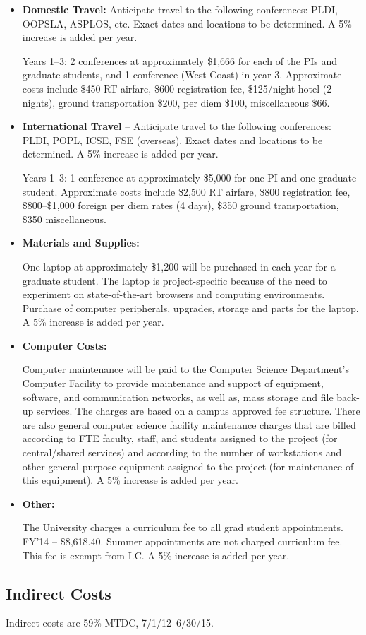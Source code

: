 \begin{itemize}
\item \textbf{Domestic Travel:} Anticipate travel to the following
  conferences: PLDI, OOPSLA, ASPLOS, etc. Exact dates and locations to
  be determined.  A 5\% increase is added per year.
 
  Years 1--3: 2 conferences at approximately \$1,666 for each of the PIs and
graduate students, and 1 conference (West Coast) in year 3. Approximate
costs include \$450 RT airfare, \$600 registration fee, \$125/night hotel (2 nights),
ground transportation \$200, per diem \$100, miscellaneous \$66.

\item \textbf{International Travel} – Anticipate travel to the
  following conferences: PLDI, POPL, ICSE, FSE (overseas). Exact dates
  and locations to be determined.  A 5\% increase is added per year.

  Years 1--3: 1 conference at approximately \$5,000 for one PI and one
  graduate student. Approximate costs include \$2,500 RT
  airfare, \$800 registration fee, \$800--\$1,000 foreign per diem
  rates (4 days), \$350 ground transportation, \$350 miscellaneous.
 
\clearpage
\thispagestyle{empty}

\item \textbf{Materials and Supplies:}

  One laptop at approximately \$1,200 will be purchased in each year
  for a graduate student.  The laptop is project-specific because of
  the need to experiment on state-of-the-art browsers and computing
  environments. Purchase of computer peripherals, upgrades, storage
  and parts for the laptop.  A 5\% increase is added per year.

\item \textbf{Computer Costs:}

  Computer maintenance will be paid to the Computer Science Department's Computer Facility to provide maintenance and support of equipment, software, and communication networks, as well as, mass storage and file back-up services. The charges are based on a campus approved fee structure.  There are also general computer science facility maintenance charges that are billed according to FTE faculty, staff, and students assigned to the project (for central/shared services) and according to the number of workstations and other general-purpose equipment assigned to the project (for maintenance of this equipment).  A 5\% increase is added per year.

\item \textbf{Other:}

  The University charges a curriculum fee to all grad student
  appointments.  FY’14 -- \$8,618.40. Summer appointments are not
  charged curriculum fee.  This fee is exempt from I.C.  A 5\%
  increase is added per year.

\end{itemize}

\subsection*{Indirect Costs}

Indirect costs are 59\% MTDC, 7/1/12--6/30/15.


\clearpage
